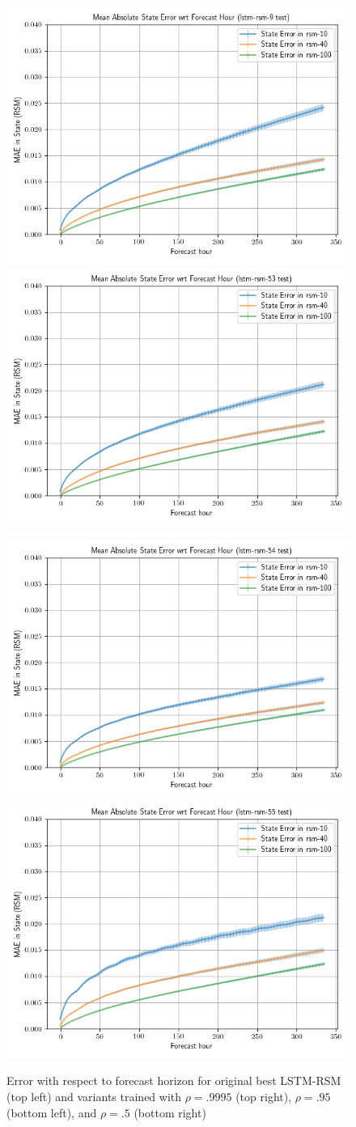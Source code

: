 \begin{figure}[h!]
    \centering
    \includegraphics[width=.48\linewidth,draft=false]{figures/loss-variations/eval_test_lstm-rsm-9_rsm_horizon_na_state.png}
    \includegraphics[width=.48\linewidth,draft=false]{figures/loss-variations/eval_test_lstm-rsm-53_rsm_horizon_na_state.png}

    \includegraphics[width=.48\linewidth,draft=false]{figures/loss-variations/eval_test_lstm-rsm-54_rsm_horizon_na_state.png}
    \includegraphics[width=.48\linewidth,draft=false]{figures/loss-variations/eval_test_lstm-rsm-55_rsm_horizon_na_state.png}

    \caption{Error with respect to forecast horizon for original best LSTM-RSM (top left) and variants trained with $\rho=.9995$ (top right), $\rho=.95$ (bottom left), and $\rho=.5$ (bottom right)}
    \label{loss-fn-ratio-horizons}
\end{figure}


